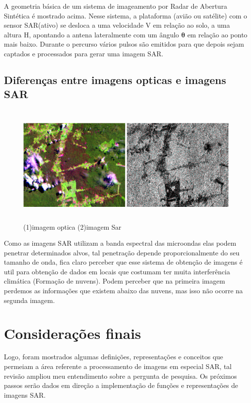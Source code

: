 \documentclass[12pt, a4paper]{article}
\begin{document}
    A geometria básica de um sistema de imageamento por Radar de Abertura Sintética é mostrado acima. Nesse sistema, a plataforma (avião ou satélite) com o sensor SAR(ativo) se desloca a uma velocidade V em relação ao solo, a uma altura H, apontando a antena lateralmente com um ângulo $\mathbf{\theta}$ em relação ao ponto mais baixo. Durante o percurso vários pulsos são emitidos para que depois sejam captados e processados para gerar uma imagem SAR.
    
    \newpage
    
    \subsection{Diferenças entre imagens opticas e imagens SAR}
    \begin{figure}[!htb]
    	\centering
    	\includegraphics[height = 6cm]{Screenshot_8}
    	\caption{(1)imagem optica (2)imagem Sar}
    	\label{figRotulo}
  	\end{figure}
    
    Como as imagens SAR utilizam a banda espectral das microondas elas podem penetrar determinados alvos, tal penetração depende proporcionalmente do seu tamanho de onda, fica claro perceber que esse sistema de obtenção de imagens é util para obtenção de dados em locais que costumam ter muita interferência climática (Formação de nuvens). Podem perceber que na primeira imagem perdemos as informações que existem abaixo das nuvens, mas isso não ocorre na segunda imagem. 
    \vspace{7mm}
    \section{Considerações finais}
    Logo, foram mostrados algumas definições, representações e conceitos que permeiam a área referente a processamento de imagens em especial SAR, tal revisão ampliou meu entendimento sobre a pergunta de pesquisa. Os próximos passos serão dados em direção a implementação de funções e representações de imagens SAR. 
    
\end{document}
